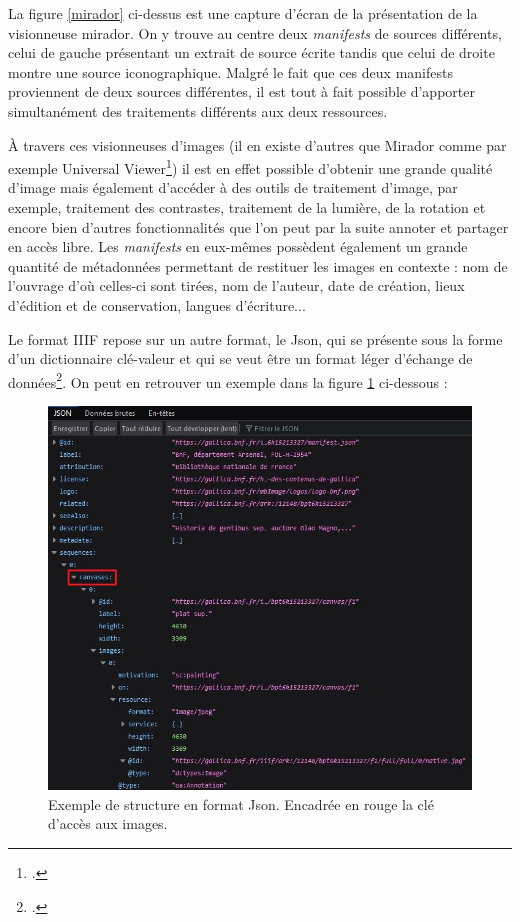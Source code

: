 \documentclass[a4paper,12pt,twoside]{book}
\begin{document}
La figure \ref{mirador} ci-dessus est une capture d'écran de la présentation de la visionneuse mirador. On y trouve au centre deux \textit{manifests} de sources différents, celui de gauche présentant un extrait de source écrite tandis que celui de droite montre une source iconographique. Malgré le fait que ces deux manifests proviennent de deux sources différentes, il est tout à fait possible d'apporter simultanément des traitements différents aux deux ressources.


À travers ces visionneuses d'images (il en existe d'autres que Mirador comme par exemple Universal Viewer\footcite{universal}) il est en effet possible d'obtenir une grande qualité d'image mais également d'accéder à des outils de traitement d'image, par exemple, traitement des contrastes, traitement de la lumière, de la rotation et encore bien d'autres fonctionnalités que l'on peut par la suite annoter et partager en accès libre. Les \textit{manifests} en eux-mêmes possèdent également un grande quantité de métadonnées permettant de restituer les images en contexte : nom de l'ouvrage d'où celles-ci sont tirées, nom de l'auteur, date de création, lieux d'édition et de conservation, langues d'écriture...


Le format \acrshort{IIIF} repose sur un autre format, le Json, qui se présente sous la forme d'un \og dictionnaire clé-valeur\fg{} et qui se veut être un format léger d'échange de données\footcite{json}. On peut en retrouver un exemple dans la figure \ref{json} ci-dessous :

\begin{figure}[H]
    \centering
    \includegraphics[width=12cm]{img/partie_3/json.JPG}
    \caption{Exemple de structure en format Json. Encadrée en rouge la clé d'accès aux images.}
    \label{json}
\end{figure}
\end{document}
